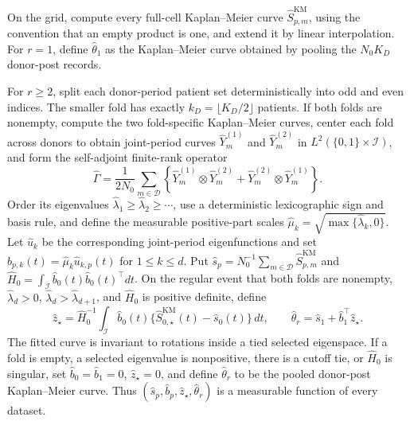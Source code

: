 On the grid, compute every full-cell Kaplan--Meier curve \(\widehat S^{\mathrm{KM}}_{p,m}\), using the convention that an empty product is one, and extend it by linear interpolation. For \(r=1\), define \(\widehat\theta_1\) as the Kaplan--Meier curve obtained by pooling the \(N_0K_D\) donor-post records.

For \(r\ge2\), split each donor-period patient set deterministically into odd and even indices. The smaller fold has exactly \(k_D=\lfloor K_D/2\rfloor\) patients. If both folds are nonempty, compute the two fold-specific Kaplan--Meier curves, center each fold across donors to obtain joint-period curves \(\widehat Y_m^{(1)}\) and \(\widehat Y_m^{(2)}\) in \(L^2(\{0,1\}\times\mathcal I)\), and form the self-adjoint finite-rank operator
\[
 \widehat\Gamma=\frac{1}{2N_0}\sum_{m\in\mathcal D}
 \left\{\widehat Y_m^{(1)}\otimes\widehat Y_m^{(2)}+
 \widehat Y_m^{(2)}\otimes\widehat Y_m^{(1)}\right\}.
\]
Order its eigenvalues \(\widehat\lambda_1\ge\widehat\lambda_2\ge\cdots\), use a deterministic lexicographic sign and basis rule, and define the measurable positive-part scales \(\widehat\mu_k=\sqrt{\max\{\widehat\lambda_k,0\}}\). Let \(\widehat u_k\) be the corresponding joint-period eigenfunctions and set \(\widehat b_{p,k}(t)=\widehat\mu_k\widehat u_{k,p}(t)\) for \(1\le k\le d\). Put \(\widehat s_p=N_0^{-1}\sum_{m\in\mathcal D}\widehat S^{\mathrm{KM}}_{p,m}\) and \(\widehat H_0=\int_{\mathcal I}\widehat b_0(t)\widehat b_0(t)^\top dt\). On the regular event that both folds are nonempty, \(\widehat\lambda_d>0\), \(\widehat\lambda_d>\widehat\lambda_{d+1}\), and \(\widehat H_0\) is positive definite, define
\[
 \widehat z_\star=\widehat H_0^{-1}\int_{\mathcal I}\widehat b_0(t)
 \{\widehat S^{\mathrm{KM}}_{0,\star}(t)-\widehat s_0(t)\}\,dt,
 \qquad
 \widehat\theta_r=\widehat s_1+\widehat b_1^\top\widehat z_\star.
\]
The fitted curve is invariant to rotations inside a tied selected eigenspace. If a fold is empty, a selected eigenvalue is nonpositive, there is a cutoff tie, or \(\widehat H_0\) is singular, set \(\widehat b_0=\widehat b_1=0\), \(\widehat z_\star=0\), and define \(\widehat\theta_r\) to be the pooled donor-post Kaplan--Meier curve. Thus \((\widehat s_p,\widehat b_p,\widehat z_\star,\widehat\theta_r)\) is a measurable function of every dataset.

